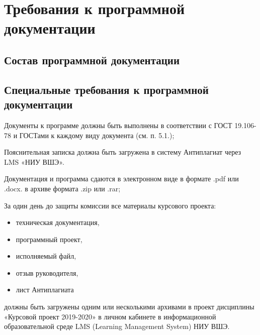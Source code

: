 \section{Требования к программной документации}

\subsection{Состав программной документации}



\subsection{Специальные требования к программной документации}

Документы к программе должны быть выполнены в соответствии с ГОСТ 19.106-78 и ГОСТами к каждому виду документа (см. п. 5.1.);

Пояснительная записка должна быть загружена в систему Антиплагиат через LMS «НИУ ВШЭ».

Документация и программа сдаются в электронном виде в формате .pdf или .docx. в архиве формата .zip или .rar;

За один день до защиты комиссии все материалы курсового проекта:
\begin{itemize}
    \item техническая документация,
    \item программный проект,
    \item исполняемый файл,
    \item отзыв руководителя,
    \item лист Антиплагиата
\end{itemize}
должны быть загружены одним или несколькими архивами в проект дисциплины «Курсовой проект 2019-2020» в личном кабинете в информационной образовательной среде LMS (Learning Management System) НИУ ВШЭ.
